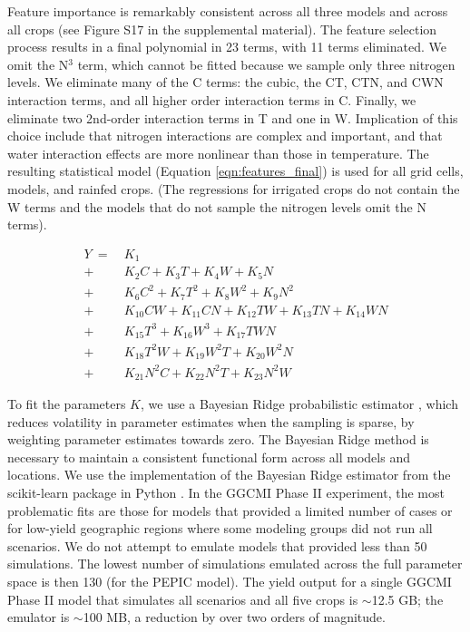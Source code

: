 \documentclass[esd, manuscript]{copernicus} %
\begin{document}
Feature importance is remarkably consistent across all three models and across all crops (see Figure S17 in the supplemental material). The feature selection process results in a final polynomial in 23 terms, with 11 terms eliminated. We omit the N$^3$ term, which cannot be fitted because we sample only three nitrogen levels. We eliminate many of the C terms: the cubic, the CT, CTN, and CWN interaction terms, and all higher order interaction terms in C. Finally, we eliminate two 2nd-order interaction terms in T and one in W. Implication of this choice include that nitrogen interactions are complex and important, and that water interaction effects are more nonlinear than those in temperature. The resulting statistical model (Equation \ref{eqn:features_final}) is used for all grid cells, models, and rainfed crops. (The regressions for irrigated crops do not contain the W terms and the models that do not sample the nitrogen levels omit the N terms).

\begin{align}
    \label{eqn:features_final}
    Y\ = \ & K_{1}  \\
		+ \ & K_{2}  C     + K_{3}  T     + K_{4}  W     + K_{5}  N   \nonumber \\
		+ \ & K_{6}  C^2   + K_{7}  T^2   + K_{8}  W^2   + K_{9}  N^2 \nonumber \\
		+ \ & K_{10} C W   + K_{11} C N   + K_{12} T W   + K_{13} T N + K_{14} W N \nonumber \\ %
		+ \ & K_{15} T^3   + K_{16} W^3   + K_{17} T W N  \nonumber \\ %
		+ \ & K_{18} T^2 W + K_{19} W^2 T + K_{20} W^2 N  \nonumber \\ %
		+ \ & K_{21} N^2 C + K_{22} N^2 T + K_{23} N^2 W  \nonumber    %
\end{align}

To fit the parameters $K$, we use a Bayesian Ridge probabilistic estimator \citep{MacKay91}, which reduces volatility in parameter estimates when the sampling is sparse, by weighting parameter estimates towards zero. The Bayesian Ridge method is necessary to maintain a consistent functional form across all models and locations. We use the implementation of the Bayesian Ridge estimator from the scikit-learn package in Python \citep{scikit-learn}. In the GGCMI Phase II experiment, the most problematic fits are those for models that provided a limited number of cases or for low-yield geographic regions where some modeling groups did not run all scenarios. We do not attempt to emulate models that provided less than 50 simulations. The lowest number of simulations emulated across the full parameter space is then 130 (for the PEPIC model). The yield output for a single GGCMI Phase II model that simulates all scenarios and all five crops is $\sim$12.5 GB; the emulator is $\sim$100 MB, a reduction by over two orders of magnitude. 
\end{document}
